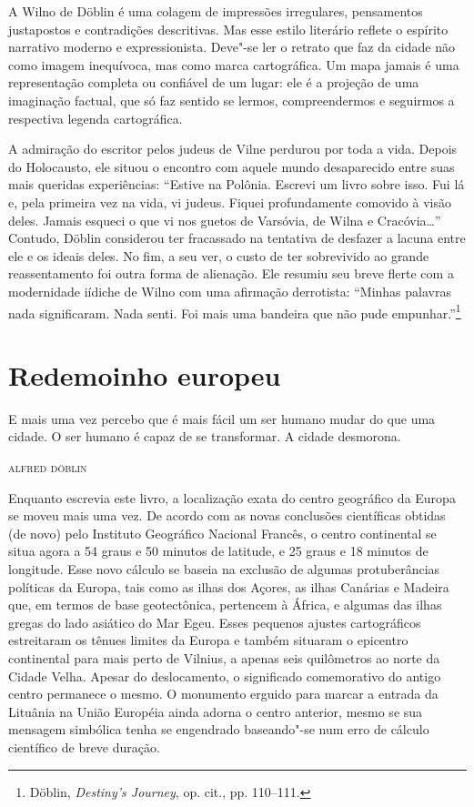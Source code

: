A Wilno de Döblin é uma colagem de impressões irregulares, pensamentos
justapostos e contradições descritivas. Mas esse estilo literário
reflete o espírito narrativo moderno e expressionista. Deve"-se ler o
retrato que faz da cidade não como imagem inequívoca, mas como marca
cartográfica. Um mapa jamais é uma representação completa ou confiável
de um lugar: ele é a projeção de uma imaginação factual, que só faz
sentido se lermos, compreendermos e seguirmos a respectiva legenda
cartográfica.

A admiração do escritor pelos judeus de Vilne perdurou por toda a vida.
Depois do Holocausto, ele situou o encontro com aquele mundo
desaparecido entre suas mais queridas experiências: ``Estive na Polônia.
Escrevi um livro sobre isso. Fui lá e, pela primeira vez na vida, vi
judeus. Fiquei profundamente comovido à visão deles. Jamais esqueci o
que vi nos guetos de Varsóvia, de Wilna e Cracóvia\ldots{}'' Contudo,
Döblin considerou ter fracassado na tentativa de desfazer a lacuna entre
ele e os ideais deles. No fim, a seu ver, o custo de ter sobrevivido ao
grande reassentamento foi outra forma de alienação. Ele resumiu seu
breve flerte com a modernidade iídiche de Wilno com uma afirmação
derrotista: ``Minhas palavras nada significaram. Nada senti. Foi mais
uma bandeira que não pude empunhar.''\footnote{Döblin, \emph{Destiny's
  Journey}, op. cit., pp. 110--111.}


\chapter[Redemoinho europeu \medskip]{Redemoinho europeu}

\epigraph{E mais uma vez percebo que é mais fácil um ser humano mudar do que uma
cidade. O ser humano é capaz de se transformar. A cidade desmorona.}{\textsc{alfred döblin}}

Enquanto escrevia este livro, a localização exata do centro geográfico
da Europa se moveu mais uma vez. De acordo com as novas conclusões
científicas obtidas (de novo) pelo Instituto Geográfico Nacional
Francês, o centro continental se situa agora a 54 graus e 50 minutos de
latitude, e 25 graus e 18 minutos de longitude. Esse novo cálculo se
baseia na exclusão de algumas protuberâncias políticas da Europa, tais
como as ilhas dos Açores, as ilhas Canárias e Madeira que, em termos de
base geotectônica, pertencem à África, e algumas das ilhas gregas do
lado asiático do Mar Egeu. Esses pequenos ajustes cartográficos
estreitaram os tênues limites da Europa e também situaram o epicentro
continental para mais perto de Vilnius, a apenas seis quilômetros ao
norte da Cidade Velha. Apesar do deslocamento, o significado
comemorativo do antigo centro permanece o mesmo. O monumento erguido
para marcar a entrada da Lituânia na União Européia ainda adorna o
centro anterior, mesmo se sua mensagem simbólica tenha se engendrado
baseando"-se num erro de cálculo científico de breve duração.

